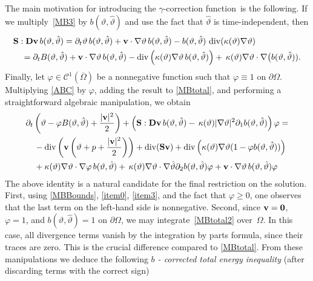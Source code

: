 \documentclass[11pt, a4paper, reqno]{amsart}
\numberwithin{equation}{section}
\newcommand{\diver}{\operatorname{div}}
\newcommand{\dert}{\partial_t}
\newcommand{\vc}[1]{{\bf #1}}
\newcommand{\vv}{\vc{v}}
\newcommand{\thet}{\vartheta}
\renewcommand{\S}{\mathbf{S}}
\newcommand{\D}{\mathbf{D}}
\newcommand{\blafnc}{correction function}
\begin{document}
The main motivation for introducing the $\gamma$-\blafnc\ is the following. If we multiply~\eqref{MB3} by $b(\thet,\hat{\thet})$ and use the fact that 
$\hat{\thet}$ is time-independent, then
\begin{equation}\label{ABC}
\begin{split}
&\S : \D \vv \, b(\thet,\hat{\thet}) = \dert  \thet\,  b(\thet,\hat{\thet}) + \vv\cdot \nabla \thet \, b(\thet,\hat{\thet}) - b(\thet,\hat{\thet})\, \diver (\kappa(\thet)\nabla \thet) \\
&\quad = \dert  B(\thet,\hat{\thet}) + \vv\cdot \nabla \thet \, b(\thet,\hat{\thet}) - \diver \left(\kappa(\thet)\nabla \thet\, b(\thet,\hat{\thet})\right)+\, \kappa(\thet)\nabla \thet \cdot \nabla \big(b(\thet,\hat{\thet})).
\end{split}
\end{equation}
Finally, let $\varphi \in \mathcal{C}^{1}(\overline{\Omega})$ be a nonnegative function such that $\varphi \equiv 1$ on $\partial \Omega$. Multiplying \eqref{ABC} by $\varphi$, adding the result to \eqref{MBtotal}, and performing a straightforward algebraic manipulation, we obtain
\begin{equation}\label{MBtotal2}
\begin{split}
  &\partial_t \left(\thet -\varphi  B(\thet,\hat{\thet}) + \frac{|\vv|^2}{2}\right) + \left(\S : \D \vv \, b(\thet,\hat{\thet}) -\, \kappa(\thet)|\nabla \thet|^2 \partial_1 b(\thet,\hat{\thet}) \right)\varphi=\\
  &\quad
  - \diver \left(\vv \left(\thet + p+\frac{|\vv|^2}{2}\right)\right) 
  + \diver (\S \vv) 
  + \diver \left(\kappa(\thet)\nabla \thet (1-\varphi b(\thet,\hat{\thet}))\right) \\
     &\quad + \kappa(\thet)\nabla \thet \cdot \nabla \varphi \, b(\thet,\hat{\thet})+\, \kappa(\thet)\nabla \thet \cdot \nabla \hat{\thet} \partial_2 b(\thet,\hat{\thet}) \varphi +\vv\cdot \nabla \thet \, b(\thet,\hat{\thet})\varphi
\end{split}
\end{equation}
The above identity is a natural candidate for the final restriction on the solution. First, using \eqref{MBBounds}, \eqref{item0}, \eqref{item3}, and the fact that $\varphi \ge 0$, one observes that the last term on the left-hand side is nonnegative. Second, since $\vv = \vc{0}$, $\varphi = 1$, and $b(\thet,\hat{\thet})=1$ on $\partial \Omega$, we may integrate~\eqref{MBtotal2} over~$\Omega$. In this case, all divergence terms vanish by the integration by parts formula, since their traces are zero. This is the crucial difference compared to \eqref{MBtotal}. From these manipulations we deduce the following \emph{ $b$ - corrected total energy inequality} (after discarding terms with the correct sign)
\end{document}
